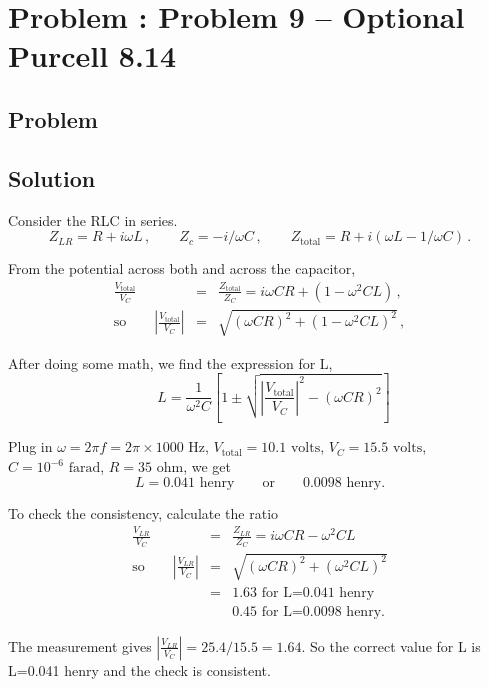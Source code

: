 \documentclass[solutions]{esg8022pset}
\begin{document}
\section{Problem \thesection: Problem 9 -- Optional Purcell 8.14}
\subsection{Problem}
\subsection{Solution}
Consider the RLC in series.
\begin{equation}
Z_{LR}=R+i\omega L\,,\qquad Z_c=-i/\omega C\,,\qquad
Z_{\textrm{total}}=R+i(\omega L-1/\omega C)\,.
\end{equation}

From the potential across both and across the capacitor,
\begin{eqnarray}
\frac{V_{\textrm{total}}}{V_C}&=&\frac{Z_{\textrm{total}}}{Z_C}=i\omega
CR+(1-\omega^2 CL)\,,\\
\textrm{so}\qquad \left| \frac{V_{\textrm{total}}}{V_C}\right| &=&
\sqrt{(\omega CR)^2+(1-\omega^2 CL)^2}\,,
\end{eqnarray}

After doing some math, we find the expression for L,
\begin{equation}
\qquad L = \frac{1}{\omega^2 C}\left[
1\pm \sqrt{\left|\frac{V_{\textrm{total}}}{V_C}\right|^2-(\omega CR)^2}
\right]
\end{equation}

Plug in $\omega=2\pi f=2\pi\times 1000\textrm{ Hz}$,
$V_{\textrm{total}}=10.1\textrm{ volts}$, $V_C=15.5\textrm{ volts}$,
$C=10^{-6}\textrm{ farad}$, $R=35\textrm{ ohm}$, we get
\[ L= 0.041 \textrm{ henry}\qquad\textrm{or}\qquad 0.0098\textrm{ henry}.\]

To check the consistency, calculate the ratio
\begin{eqnarray}
\frac{V_{LR}}{V_C}&=&\frac{Z_{LR}}{Z_C}=i\omega CR-\omega^2 CL\\
\textrm{so}\qquad \left|\frac{V_{LR}}{V_C}\right| &=& \sqrt{(\omega
CR)^2+(\omega^2 CL)^2}\\
&=& 1.63 \textrm{ for L=0.041 henry}\nonumber\\
& & 0.45\textrm{ for L=0.0098 henry}.
\end{eqnarray}

The measurement gives $\left|\frac{V_{LR}}{V_C}\right| =
25.4/15.5=1.64$.  So the correct value for L is L=0.041 henry and the
check is consistent.
\end{document}
